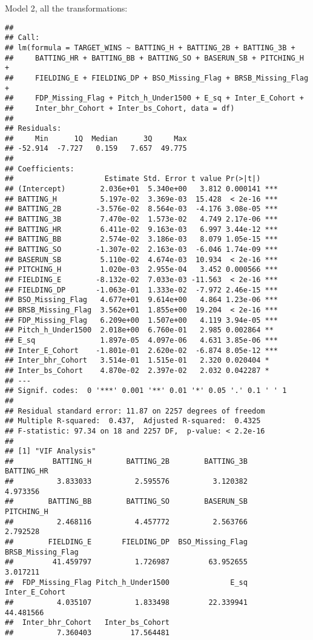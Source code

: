 \documentclass[
]{article}
\begin{document}
Model 2, all the transformations:

\begin{verbatim}
## 
## Call:
## lm(formula = TARGET_WINS ~ BATTING_H + BATTING_2B + BATTING_3B + 
##     BATTING_HR + BATTING_BB + BATTING_SO + BASERUN_SB + PITCHING_H + 
##     FIELDING_E + FIELDING_DP + BSO_Missing_Flag + BRSB_Missing_Flag + 
##     FDP_Missing_Flag + Pitch_h_Under1500 + E_sq + Inter_E_Cohort + 
##     Inter_bhr_Cohort + Inter_bs_Cohort, data = df)
## 
## Residuals:
##     Min      1Q  Median      3Q     Max 
## -52.914  -7.727   0.159   7.657  49.775 
## 
## Coefficients:
##                     Estimate Std. Error t value Pr(>|t|)    
## (Intercept)        2.036e+01  5.340e+00   3.812 0.000141 ***
## BATTING_H          5.197e-02  3.369e-03  15.428  < 2e-16 ***
## BATTING_2B        -3.576e-02  8.564e-03  -4.176 3.08e-05 ***
## BATTING_3B         7.470e-02  1.573e-02   4.749 2.17e-06 ***
## BATTING_HR         6.411e-02  9.163e-03   6.997 3.44e-12 ***
## BATTING_BB         2.574e-02  3.186e-03   8.079 1.05e-15 ***
## BATTING_SO        -1.307e-02  2.163e-03  -6.046 1.74e-09 ***
## BASERUN_SB         5.110e-02  4.674e-03  10.934  < 2e-16 ***
## PITCHING_H         1.020e-03  2.955e-04   3.452 0.000566 ***
## FIELDING_E        -8.132e-02  7.033e-03 -11.563  < 2e-16 ***
## FIELDING_DP       -1.063e-01  1.333e-02  -7.972 2.46e-15 ***
## BSO_Missing_Flag   4.677e+01  9.614e+00   4.864 1.23e-06 ***
## BRSB_Missing_Flag  3.562e+01  1.855e+00  19.204  < 2e-16 ***
## FDP_Missing_Flag   6.209e+00  1.507e+00   4.119 3.94e-05 ***
## Pitch_h_Under1500  2.018e+00  6.760e-01   2.985 0.002864 ** 
## E_sq               1.897e-05  4.097e-06   4.631 3.85e-06 ***
## Inter_E_Cohort    -1.801e-01  2.620e-02  -6.874 8.05e-12 ***
## Inter_bhr_Cohort   3.514e-01  1.515e-01   2.320 0.020404 *  
## Inter_bs_Cohort    4.870e-02  2.397e-02   2.032 0.042287 *  
## ---
## Signif. codes:  0 '***' 0.001 '**' 0.01 '*' 0.05 '.' 0.1 ' ' 1
## 
## Residual standard error: 11.87 on 2257 degrees of freedom
## Multiple R-squared:  0.437,  Adjusted R-squared:  0.4325 
## F-statistic: 97.34 on 18 and 2257 DF,  p-value: < 2.2e-16
## 
## [1] "VIF Analysis"
##         BATTING_H        BATTING_2B        BATTING_3B        BATTING_HR 
##          3.833033          2.595576          3.120382          4.973356 
##        BATTING_BB        BATTING_SO        BASERUN_SB        PITCHING_H 
##          2.468116          4.457772          2.563766          2.792528 
##        FIELDING_E       FIELDING_DP  BSO_Missing_Flag BRSB_Missing_Flag 
##         41.459797          1.726987         63.952655          3.017211 
##  FDP_Missing_Flag Pitch_h_Under1500              E_sq    Inter_E_Cohort 
##          4.035107          1.833498         22.339941         44.481566 
##  Inter_bhr_Cohort   Inter_bs_Cohort 
##          7.360403         17.564481
\end{verbatim}
\end{document}
